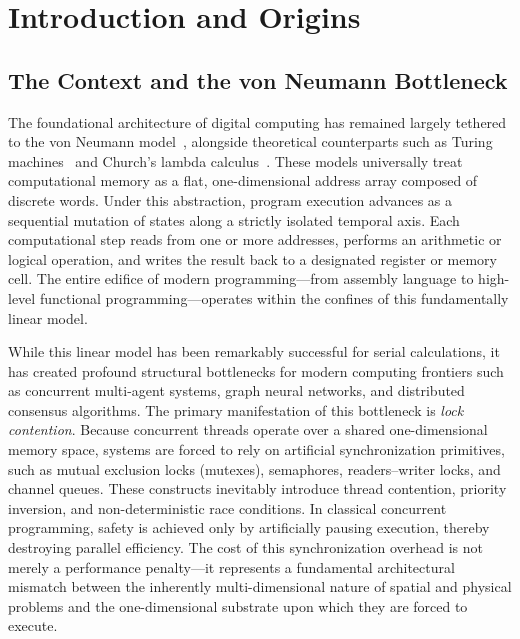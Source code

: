 \documentclass[manuscript, nonacm, review=false]{acmart}
\theoremstyle{definition}
\theoremstyle{plain}
\begin{document}
\maketitle

\setcounter{tocdepth}{3}
\tableofcontents
\newpage


\section{Introduction and Origins}
\label{sec:introduction}

\subsection{The Context and the von Neumann Bottleneck}
\label{subsec:vonneumann}

The foundational architecture of digital computing has remained largely tethered to the von Neumann model~\cite{vonneumann1945}, alongside theoretical counterparts such as Turing machines~\cite{turing1936} and Church's lambda calculus~\cite{church1936}. These models universally treat computational memory as a flat, one-dimensional address array composed of discrete words. Under this abstraction, program execution advances as a sequential mutation of states along a strictly isolated temporal axis. Each computational step reads from one or more addresses, performs an arithmetic or logical operation, and writes the result back to a designated register or memory cell. The entire edifice of modern programming---from assembly language to high-level functional programming---operates within the confines of this fundamentally linear model.

While this linear model has been remarkably successful for serial calculations, it has created profound structural bottlenecks for modern computing frontiers such as concurrent multi-agent systems, graph neural networks, and distributed consensus algorithms. The primary manifestation of this bottleneck is \emph{lock contention}. Because concurrent threads operate over a shared one-dimensional memory space, systems are forced to rely on artificial synchronization primitives, such as mutual exclusion locks (mutexes), semaphores, readers--writer locks, and channel queues. These constructs inevitably introduce thread contention, priority inversion, and non-deterministic race conditions. In classical concurrent programming, safety is achieved only by artificially pausing execution, thereby destroying parallel efficiency. The cost of this synchronization overhead is not merely a performance penalty---it represents a fundamental architectural mismatch between the inherently multi-dimensional nature of spatial and physical problems and the one-dimensional substrate upon which they are forced to execute.
\end{document}
